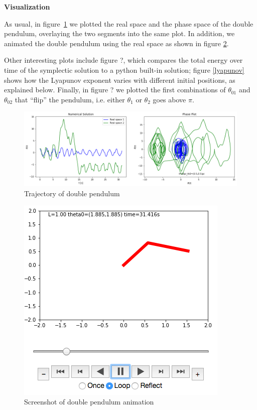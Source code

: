 \begin{problem}{1}
\textbf{Visualization}

As usual, in figure~\ref{double} we plotted the real space and the phase space
of the double pendulum, overlaying the two segments into the same plot. In addition,
we animated the double pendulum using the real space as shown in figure \ref{anim}.

Other interesting plots include figure ?, which compares the total energy over
time of the symplectic solution to a python built-in solution; figure
\ref{lyapunov} shows how the Lyapunov exponent varies with different initial
positions, as explained below. Finally, in figure ? we plotted the first
combinations of $\theta_{01}$ and $\theta_{02}$ that ``flip'' the pendulum, i.e.
either $\theta_1$ or $\theta_2$ goes above $\pi$.

\begin{figure}[ht!]
	\centering
	\includegraphics[scale=0.6]{../figures/t=10pi_th0=(05,05)pidoublePend.png}
	\caption{Trajectory of double pendulum}
	\label{double}
\end{figure}

\begin{figure}[ht!]
	\centering
	\includegraphics[scale=0.5]{../figures/doublePendAnim.png}
	\caption{Screenshot of double pendulum animation}
	\label{anim}
\end{figure}

\end{problem}

